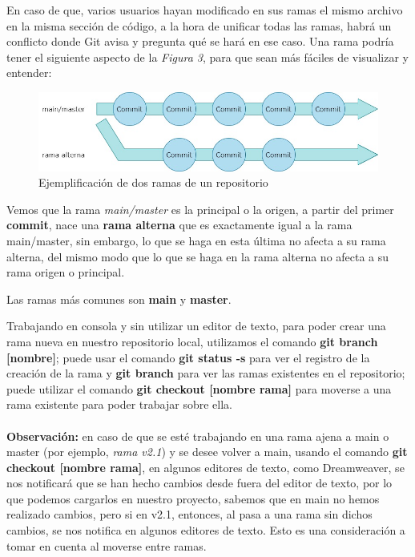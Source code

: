 En caso de que, varios usuarios hayan modificado en sus ramas el mismo archivo en la misma sección de código, a la hora de unificar todas las ramas, habrá un conflicto donde Git avisa y pregunta qué se hará en ese caso. Una rama podría tener el siguiente aspecto de la \textit{Figura 3}, para que sean más fáciles de visualizar y entender:
\begin{figure}[H]
    \begin{center}
        \caption{Ejemplificación de dos ramas de un repositorio}
        \label{fig: 3}
        \includegraphics[width=\textwidth]{conceptos/g3.jpg}
    \end{center}
\end{figure}

Vemos que la rama \textit{main/master} es la principal o la origen, a partir del primer \textbf{commit}, nace una \textbf{rama alterna} que es exactamente igual a la rama main/master, sin embargo, lo que se haga en esta última no afecta a su rama alterna, del mismo modo que lo que se haga en la rama alterna no afecta a su rama origen o principal.

Las ramas más comunes son \textbf{main} y \textbf{master}.

Trabajando en consola y sin utilizar un editor de texto, para poder crear una rama nueva en nuestro repositorio local, utilizamos el comando \textbf{git branch [nombre]}; puede usar el comando \textbf{git status -s} para ver el registro de la creación de la rama y \textbf{git branch} para ver las ramas existentes en el repositorio; puede utilizar el comando \textbf{git checkout [nombre rama]} para moverse a una rama existente para poder trabajar sobre ella.\\
\\
\textbf{Observación:} en caso de que se esté trabajando en una rama ajena a main o master (por ejemplo, \textit{rama v2.1}) y se desee volver a main, usando el comando \textbf{git checkout [nombre rama]}, en algunos editores de texto, como Dreamweaver, se nos notificará que se han hecho cambios desde fuera del editor de texto, por lo que podemos cargarlos en nuestro proyecto, sabemos que en main no hemos realizado cambios, pero si en v2.1, entonces, al pasa a una rama sin dichos cambios, se nos notifica en algunos editores de texto. Esto es una consideración a tomar en cuenta al moverse entre ramas.

